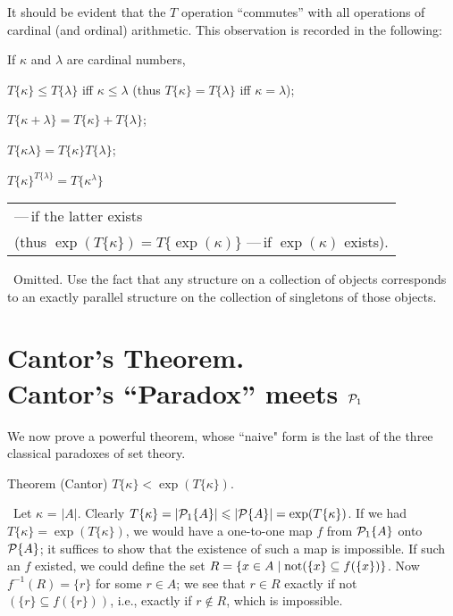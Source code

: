 It should be evident that the $T$ operation ``commutes'' with all
operations of cardinal (and ordinal) arithmetic.  This
observation is recorded in the following:

\begin{lemme}
 If $\kappa$ and $\lambda$ are cardinal
 numbers,

 $T\{\kappa\} \leq T\{\lambda\}$ iff $\kappa \leq \lambda$ (thus 
 $T\{\kappa\} = T\{\lambda\}$ iff $\kappa = \lambda$);

 $T\{\kappa + \lambda\}
 = T\{\kappa\} + T\{\lambda\}$;

 $T\{\kappa\lambda\} = T\{\kappa\}T\{\lambda\}$;

 $T\{\kappa\}^{T\{\lambda\}} = T\{\kappa^{\lambda}\}$ 
 \begin{tabular}[t]{@{}l}
  ---\,if the latter  exists\\
  (thus $\exp(T\{\kappa\}) = T\{\exp(\kappa)\}$ ---\,if $\exp(\kappa)$ exists).
 \end{tabular}
\end{lemme}

\preuve\ Omitted.  Use the fact that any structure on a collection of objects
corresponds to an exactly parallel structure on the collection of
singletons of those objects.
\finpreuve


\section[Cantor's Theorem and Paradox]{Cantor's Theorem.\\ Cantor's ``Paradox''
meets ${\cal P}_1$}

We now prove a powerful theorem, whose ``naive" form is the
last of the three classical paradoxes of set theory.

\begin{Thm}{Theorem (Cantor)}
 $T\{\kappa\} < \exp(T\{\kappa\})$.
\end{Thm}


\preuve\ Let $\kappa$ = $|A|$.  Clearly $T\{\kappa\} = |{\cal P}_1\{A\}| \leq
|{\cal P}\{A\}| = \exp(T\{\kappa\})$.
If we had $T\{\kappa\} = \exp(T\{\kappa\})$, we would have a
one-to-one map $f$ from ${\cal P}_1\{A\}$
onto ${\cal P}\{A\}$; it suffices to show that the existence of such a map is
impossible.  If such an $f$ existed, we could define the set $R = 
\{x \in A \st \mathrm{not}(\{x\} \subseteq f(\{x\})\}$.  Now $f^{-1}(R) =
\{r\}$ for
some $r \in A$; we see that $r \in R$ exactly if not$(\{r\} \subseteq
f(\{r\}))$, i.e., exactly if $r \not\in R$,
which is impossible.
\finpreuve

